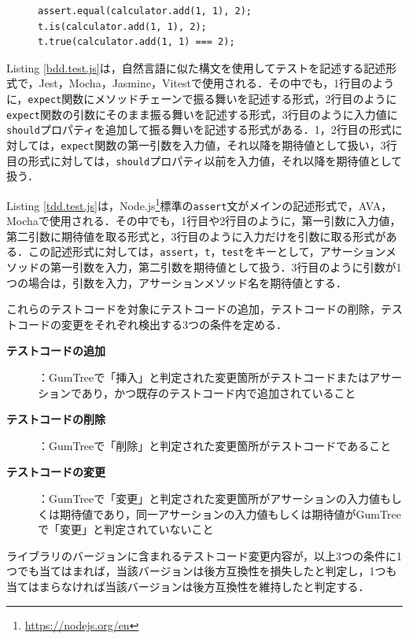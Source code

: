 \documentclass[submit]{ipsj}
\begin{document}
{\begin{figure}[t]
\vspace{-3mm}

\begin{lstlisting}[caption=アサーション例2, label=tdd.test.js]
assert.equal(calculator.add(1, 1), 2);
t.is(calculator.add(1, 1), 2);  
t.true(calculator.add(1, 1) === 2);
\end{lstlisting}
\vspace{-3mm}
\end{figure}



Listing \ref{bdd.test.js}は，自然言語に似た構文を使用してテストを記述する記述形式で，Jest，Mocha，Jasmine，Vitestで使用される．その中でも，1行目のように，{\verb|expect|}関数にメソッドチェーンで振る舞いを記述する形式，2行目のように{\verb|expect|}関数の引数にそのまま振る舞いを記述する形式，3行目のように入力値に{\verb|should|}プロパティを追加して振る舞いを記述する形式がある．1，2行目の形式に対しては，{\verb|expect|}関数の第一引数を入力値，それ以降を期待値として扱い，3行目の形式に対しては，{\verb|should|}プロパティ以前を入力値，それ以降を期待値として扱う．


Listing \ref{tdd.test.js}は，Node.js\footnote{\url{https://nodejs.org/en}}標準の{\verb|assert|}文がメインの記述形式で，AVA，Mochaで使用される．その中でも，1行目や2行目のように，第一引数に入力値，第二引数に期待値を取る形式と，3行目のように入力だけを引数に取る形式がある．この記述形式に対しては，{\verb|assert|}，{\verb|t|}，{\verb|test|}をキーとして，アサーションメソッドの第一引数を入力，第二引数を期待値として扱う．3行目のように引数が1つの場合は，引数を入力，アサーションメソッド名を期待値とする．

これらのテストコードを対象にテストコードの追加，テストコードの削除，テストコードの変更をそれぞれ検出する3つの条件を定める．

\begin{description}
  \item[\textbf{テストコードの追加}]：GumTreeで「挿入」と判定された変更箇所がテストコードまたはアサーションであり，かつ既存のテストコード内で追加されていること
  \item[\textbf{テストコードの削除}]：GumTreeで「削除」と判定された変更箇所がテストコードであること
  \item[\textbf{テストコードの変更}]：GumTreeで「変更」と判定された変更箇所がアサーションの入力値もしくは期待値であり，同一アサーションの入力値もしくは期待値がGumTreeで「変更」と判定されていないこと
\end{description}

ライブラリのバージョンに含まれるテストコード変更内容が，以上3つの条件に1つでも当てはまれば，当該バージョンは後方互換性を損失したと判定し，1つも当てはまらなければ当該バージョンは後方互換性を維持したと判定する．

}
\end{document}
